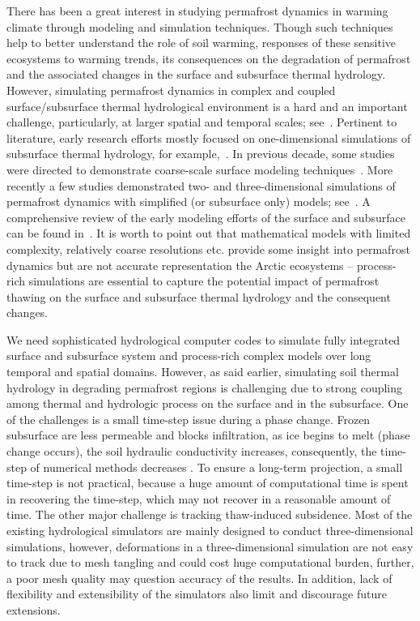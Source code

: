 \documentclass[review]{elsarticle}
\begin{document}
There has been a great interest in studying permafrost dynamics in warming climate through modeling and simulation techniques. Though such techniques help to better understand the role of soil warming, responses of these sensitive ecosystems to warming trends, its consequences on the degradation of permafrost and the associated changes in the surface and subsurface thermal hydrology. However, simulating permafrost dynamics in complex and coupled surface/subsurface thermal hydrological environment is a hard and an important challenge, particularly, at larger spatial and temporal scales; see~\cite{painter2013modeling}. Pertinent to literature, early research efforts mostly focused on one-dimensional simulations of subsurface thermal hydrology, for example,~\cite{harlan1973analysis, guymon1974coupled, taylor1978model}. In previous decade, some studies were directed to demonstrate coarse-scale surface modeling techniques~\cite{takata2003development, nicolsky2007improved, mckenzie2007groundwater}. More recently a few studies demonstrated two- and three-dimensional simulations of permafrost dynamics with simplified (or subsurface only) models; see~\cite{bense2009evolution, lawrence2012simulation,  koven2013analysis, karra2014three}. A comprehensive review of the early modeling efforts of the surface and subsurface can be found in~\cite{kurylyk2014climate}. It is worth to point out that mathematical models with limited complexity, relatively coarse resolutions etc. provide some insight into permafrost dynamics but are not accurate representation the Arctic ecosystems -- process-rich simulations are essential to capture the potential impact of permafrost thawing on the surface and subsurface thermal hydrology and the consequent changes.

We need sophisticated hydrological computer codes to simulate fully integrated surface and subsurface system and process-rich complex models over long temporal and spatial domains. However, as said earlier, simulating soil thermal hydrology in degrading permafrost regions is challenging due to strong coupling among thermal and hydrologic process on the surface and in the subsurface. One of the challenges is a small time-step issue during a phase change. Frozen subsurface are less permeable and blocks infiltration, as ice begins to melt (phase change occurs), the soil hydraulic conductivity increases, consequently, the time-step of numerical methods decreases \cite{dall2011robust}. To ensure a long-term projection, a small time-step is not practical, because a huge amount of computational time is spent in recovering the time-step, which may not recover in a reasonable amount of time. The other major challenge is tracking thaw-induced subsidence. Most of the existing hydrological simulators are mainly designed to conduct three-dimensional simulations, however, deformations in a three-dimensional simulation are not easy to track due to mesh tangling and could cost huge computational burden, further, a poor mesh quality may question accuracy of the results. In addition, lack of flexibility and extensibility of the simulators also limit and discourage future extensions.
\end{document}
